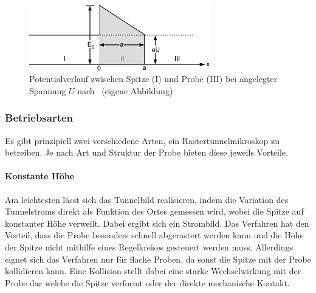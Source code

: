\documentclass[a4paper,twoside,final]{article}
\begin{document}
\begin{figure}[htp]
    \centering
    \includegraphics[width=0.7\textwidth]{Bilder/Tunneleffekt_Spannung.pdf}
    \caption{Potentialverlauf zwischen Spitze (I) und Probe (III) bei angelegter Spannung $U$ nach~\cite{Hamann} (eigene Abbildung)}
    \label{fig:Tunneleffekt_Spannung}
\end{figure}

\subsubsection{Betriebsarten}\label{sec:Betriebsarten}
Es gibt prinzipiell zwei verschiedene Arten, ein Rastertunnelmikroskop zu betreiben. Je nach Art und Struktur der Probe bieten diese jeweils Vorteile.
\paragraph{Konstante Höhe} Am leichtesten lässt sich das Tunnelbild realisieren, indem die Variation des Tunnelstroms direkt als Funktion des Ortes gemessen wird, wobei die Spitze auf konstanter Höhe verweilt. Dabei ergibt sich ein Strombild. Das Verfahren hat den Vorteil, dass die Probe besonders schnell abgerastert werden kann und die Höhe der Spitze nicht mithilfe eines Regelkreises gesteuert werden muss. Allerdings eignet sich das Verfahren nur für flache Proben, da sonst die Spitze mit der Probe kollidieren kann. Eine Kollision stellt dabei eine starke Wechselwirkung mit der Probe dar welche die Spitze verformt oder der direkte mechanische Kontakt.
\end{document}
